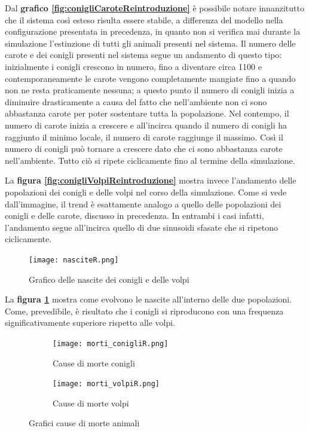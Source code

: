 \documentclass[11pt]{article}
\begin{document}
\newpage

Dal \textbf{grafico \ref{fig:conigliCaroteReintroduzione}} è possibile notare innanzitutto che il sistema così esteso risulta essere stabile, a differenza del modello nella configurazione presentata in precedenza, in quanto non si verifica mai durante la simulazione l'estinzione di tutti gli animali presenti nel sistema. 
Il numero delle carote e dei conigli presenti nel sistema segue un andamento di questo tipo: inizialmente i conigli crescono in numero, fino a diventare circa 1100 e contemporaneamente le carote vengono completamente mangiate fino a quando non ne resta praticamente nessuna; a questo punto il numero di conigli inizia a diminuire drasticamente a causa del fatto che nell'ambiente non ci sono abbastanza carote per poter sostentare tutta la popolazione. Nel contempo, il numero di carote inizia a crescere e all'incirca quando il numero di conigli ha raggiunto il minimo locale, il numero di carote raggiunge il massimo. Così il numero di conigli può tornare a crescere dato che ci sono abbastanza carote nell'ambiente. Tutto ciò si ripete ciclicamente fino al termine della simulazione. 

La \textbf{figura \ref{fig:conigliVolpiReintroduzione}} mostra invece l'andamento delle popolazioni dei conigli e delle volpi nel corso della simulazione. Come si vede dall'immagine, il trend è esattamente analogo a quello delle popolazioni dei conigli e delle carote, discusso in precedenza. In entrambi i casi infatti, l'andamento segue all'incirca quello di due sinusoidi sfasate che si ripetono ciclicamente.


\begin{figure}[h!]
     \centering
     \texttt{[image: nasciteR.png]}
     \caption{Grafico delle nascite dei conigli e delle volpi}
     \label{fig:nasciteReintroduzione}
\end{figure}



La \textbf{figura \ref{fig:nasciteReintroduzione}} mostra come evolvono le nascite all'interno delle due popolazioni. Come, prevedibile, è risultato che i conigli si riproducono con una frequenza significativamente superiore rispetto alle volpi. 

\newpage

\begin{figure}[!ht]
	\begin{subfigure}{\textwidth}
         \centering
         \texttt{[image: morti\_conigliR.png]}
         \caption{Cause di morte conigli}
         \label{fig:morteConigliReintroduzione}
	\end{subfigure}
	\begin{subfigure}{\textwidth}
		\centering
        \texttt{[image: morti\_volpiR.png]}
        \caption{Cause di morte volpi}
        \label{fig:morteVolpiReintroduzione}
	\end{subfigure}
	\caption{Grafici cause di morte animali}
\end{figure}
\end{document}
